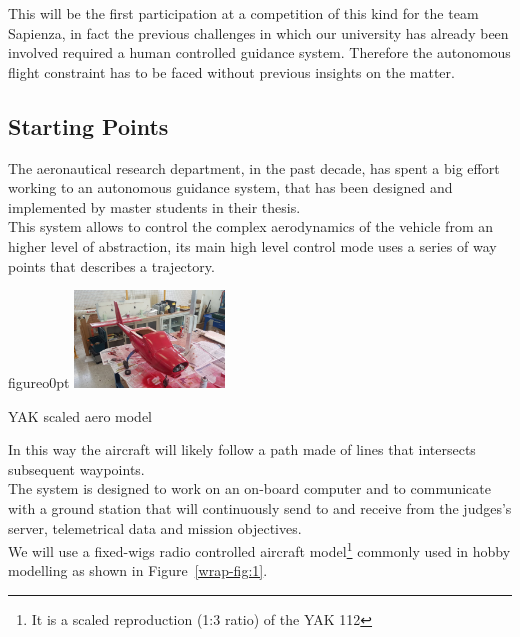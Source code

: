\documentclass[oneside,onecolumn]{article}
\begin{document}
This will be the first participation at a competition of this kind for the team
Sapienza, in fact the previous challenges in which our university has already
been involved required a human controlled guidance system.
Therefore the autonomous flight constraint has to be faced without previous
insights on the matter.

\subsection{Starting Points}
The aeronautical research department, in the past decade, has spent a big
effort working to an autonomous guidance system, that has been designed
 and implemented by master students in their thesis.\\
This system allows to control the complex aerodynamics of the vehicle from an
higher level of abstraction, its main high level control mode uses a series of
way points that describes a trajectory.\\

\begin{wrapfloat}{figure}{o}{0pt}
  \includegraphics[width=0.3\textwidth]{YAK1}
  \caption{YAK scaled aero model}\label{wrap-fig:1}
\end{wrapfloat} 


In this way the aircraft will likely follow a path made of lines that intersects subsequent waypoints.\\
The system is designed to work on an on-board computer and to communicate with a
ground station that will continuously send to and receive from the judges's
server, telemetrical data and mission objectives.\\
We will use a fixed-wigs radio controlled aircraft model\footnote{It is a scaled
  reproduction (1:3 ratio) of the YAK 112} commonly used in hobby
modelling as shown in Figure~\ref{wrap-fig:1}.
\end{document}
